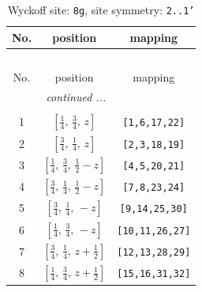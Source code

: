 \documentclass[fleqn,8pt]{jsarticle}
\begin{document}
\renewcommand{\arraystretch}{1.2}
\begin{longtable}{ccc}
\caption{Wyckoff site: {\tt 8g}, site symmetry: {\tt 2..1'}}
 \\
 \hline \hline
No. & position & mapping \\ \hline \endfirsthead

\multicolumn{2}{l}{\tablename\ \thetable{}} \\
 \hline \hline
No. & position & mapping \\ \hline \endhead

 \hline \hline
\multicolumn{2}{r}{\footnotesize\it continued ...} \\ \endfoot

 \hline \hline
\multicolumn{2}{r}{} \\ \endlastfoot

1 & $\left[ \frac{1}{4},\, \frac{3}{4},\, z \right]$ & {\tt [1,6,17,22]} \\ \hline
2 & $\left[ \frac{3}{4},\, \frac{1}{4},\, z \right]$ & {\tt [2,3,18,19]} \\ \hline
3 & $\left[ \frac{1}{4},\, \frac{3}{4},\, \frac{1}{2} - z \right]$ & {\tt [4,5,20,21]} \\ \hline
4 & $\left[ \frac{3}{4},\, \frac{1}{4},\, \frac{1}{2} - z \right]$ & {\tt [7,8,23,24]} \\ \hline
5 & $\left[ \frac{3}{4},\, \frac{1}{4},\, - z \right]$ & {\tt [9,14,25,30]} \\ \hline
6 & $\left[ \frac{1}{4},\, \frac{3}{4},\, - z \right]$ & {\tt [10,11,26,27]} \\ \hline
7 & $\left[ \frac{3}{4},\, \frac{1}{4},\, z + \frac{1}{2} \right]$ & {\tt [12,13,28,29]} \\ \hline
8 & $\left[ \frac{1}{4},\, \frac{3}{4},\, z + \frac{1}{2} \right]$ & {\tt [15,16,31,32]} \\
\end{longtable}
\renewcommand{\arraystretch}{1.2}
\end{document}
